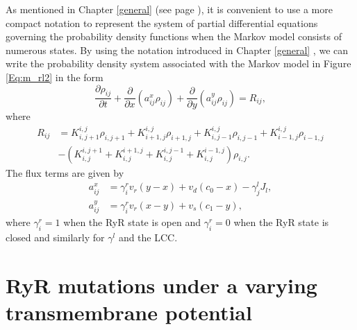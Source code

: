 As mentioned in Chapter \ref{general} (see page \pageref{general}), it is convenient to use a more compact notation to represent the system of partial differential equations governing the probability density functions when the Markov model consists of numerous states. By using the notation introduced in Chapter \ref{general} , we can write the probability density system associated with the Markov model in Figure \ref{Eq:m_rl2} in the form
\begin{equation}
\frac{\partial\rho_{ij}}{\partial t}+\frac{\partial}{\partial x}\left(
a_{ij}^{x}\rho_{ij}\right)  +\frac{\partial}{\partial y}\left(  a_{ij}^{y}
\rho_{ij}\right)  =R_{ij}, \label{pdf16}
\end{equation}
where
\begin{align*}
R_{ij}  & =K_{i,j+1}^{i,j}\rho_{i,j+1}+K_{i+1,j}^{i,j}\rho_{i+1,j}
+K_{i,j-1}^{i,j}\rho_{i,j-1}+K_{i-1,j}^{i,j}\rho_{i-1,j}\\
& -\left(  K_{i,j}^{i,j+1}+K_{i,j}^{i+1,j}+K_{i,j}^{i,j-1}+K_{i,j}
^{i-1,j}\right)  \rho_{i,j}.
\end{align*}
 The flux terms are given by
\begin{align*}
a_{ij}^{x} &  =\gamma^{r}_{i}v_{r}\left(  y-x\right)  +v_{d}\left(
c_{0}-x\right) -\gamma^{l}_{j}J_{l} ,\\
a_{ij}^{y} &  =\gamma^{r}_{i}v_{r}\left(  x-y\right)  +v_{s}\left(
c_{1}-y\right)  ,
\end{align*}
where $\gamma^{r}_{i}=1$ when the RyR state is open and
$\gamma^{r}_{i}=0$ when the RyR state is closed and similarly for $\gamma^{l}$ and the LCC.


\section[RyR mutations]{RyR mutations under a varying transmembrane potential}

